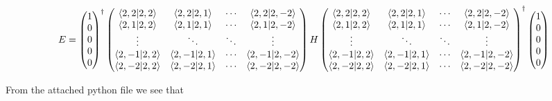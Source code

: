 \documentclass[11pt]{article} %
\begin{document}
\begin{equation}
E=\begin{pmatrix} 1 \\ 0 \\ 0 \\0 \\0 \end{pmatrix}^\dagger \begin{pmatrix} 
\braket{2,2|2,2}&\braket{2,2|2,1}&  \cdots &    \braket{2,2|2,-2}\\
\braket{2,1|2,2}&\braket{2,1|2,1}& \cdots & \braket{2,1|2,-2}\\
\vdots &\ddots & \ddots & \vdots \\
\braket{2,-1|2,2}&\braket{2,-1|2,1}& \cdots & \braket{2,-1|2,-2}\\
\braket{2,-2|2,2}&\braket{2,-2|2,1}& \cdots & \braket{2,-2|2,-2}\\
\end{pmatrix}H \begin{pmatrix}
\braket{2,2|2,2}&\braket{2,2|2,1}&  \cdots &    \braket{2,2|2,-2}\\
\braket{2,1|2,2}&\braket{2,1|2,1}& \cdots & \braket{2,1|2,-2}\\
\vdots &\ddots & \ddots & \vdots \\
\braket{2,-1|2,2}&\braket{2,-1|2,1}& \cdots & \braket{2,-1|2,-2}\\
\braket{2,-2|2,2}&\braket{2,-2|2,1}& \cdots & \braket{2,-2|2,-2}\\
\end{pmatrix}^\dagger \begin{pmatrix} 1 \\ 0 \\ 0 \\0 \\0 \end{pmatrix}
\end{equation}
	
 
From the attached python file we see that\\
\end{document}
